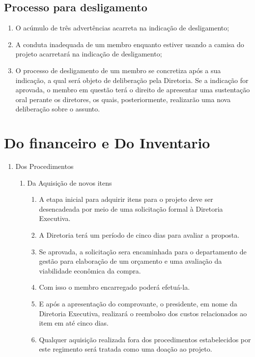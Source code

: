     \section{Processo para desligamento}
    \begin{enumerate}
        \item O acúmulo de três advertências acarreta na indicação de desligamento;
        \item A conduta inadequada de um membro enquanto estiver usando a camisa do projeto acarretará na indicação de desligamento;
        \item O processo de desligamento de um membro se concretiza após a sua indicação, a qual será objeto de deliberação pela Diretoria. Se a indicação for aprovada, o membro em questão terá o direito de apresentar uma sustentação oral perante os diretores, os quais, posteriormente, realizarão uma nova deliberação sobre o assunto.
    \end{enumerate}
         
\chapter{Do financeiro e Do Inventario}
    \begin{enumerate}
    \item Dos Procedimentos 
        \begin{enumerate}
            \item Da Aquisição de novos itens
            \begin{enumerate}
                \item A etapa inicial para adquirir itens para o projeto deve ser desencadeada por meio de uma solicitação formal à Diretoria Executiva.
                \item A Diretoria terá um período de cinco dias para avaliar a proposta. 
                \item Se aprovada, a solicitação sera encaminhada para o departamento de gestão para elaboração de um orçamento e uma avaliação da viabilidade econômica da compra.
                \item Com isso o membro encarregado poderá efetuá-la. 
                \item E após a apresentação do comprovante, o presidente, em nome da Diretoria Executiva, realizará o reembolso dos custos relacionados ao item em até cinco dias.
                \item Qualquer aquisição realizada fora dos procedimentos estabelecidos por este regimento será tratada como uma doação ao projeto.
            \end{enumerate}
             
        \end{enumerate}
    \end{enumerate}
 
